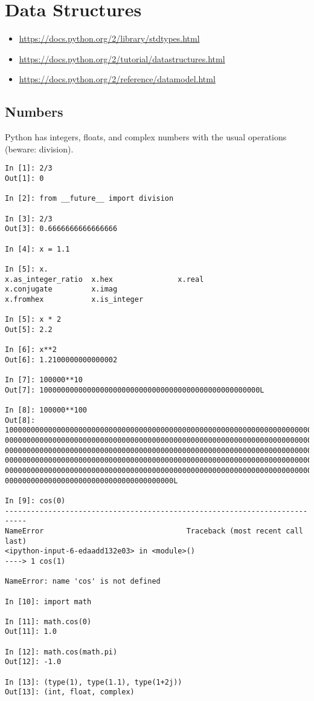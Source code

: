 \section{\label{sec:datastructures}Data Structures}
\begin{itemize}
\item \url{https://docs.python.org/2/library/stdtypes.html}
\item \url{https://docs.python.org/2/tutorial/datastructures.html}
\item \url{https://docs.python.org/2/reference/datamodel.html}
\end{itemize}

\subsection{Numbers}

Python has integers, floats, and complex numbers with the usual
operations (beware: division).

\begin{verbatim}
In [1]: 2/3
Out[1]: 0

In [2]: from __future__ import division

In [3]: 2/3
Out[3]: 0.6666666666666666

In [4]: x = 1.1

In [5]: x.
x.as_integer_ratio  x.hex               x.real
x.conjugate         x.imag              
x.fromhex           x.is_integer        

In [5]: x * 2
Out[5]: 2.2

In [6]: x**2
Out[6]: 1.2100000000000002

In [7]: 100000**10
Out[7]: 100000000000000000000000000000000000000000000000000L

In [8]: 100000**100
Out[8]: 10000000000000000000000000000000000000000000000000000000000000000000000000000000000000
0000000000000000000000000000000000000000000000000000000000000000000000000000000000000000000000
0000000000000000000000000000000000000000000000000000000000000000000000000000000000000000000000
0000000000000000000000000000000000000000000000000000000000000000000000000000000000000000000000
0000000000000000000000000000000000000000000000000000000000000000000000000000000000000000000000
000000000000000000000000000000000000000L

In [9]: cos(0)
---------------------------------------------------------------------------
NameError                                 Traceback (most recent call last)
<ipython-input-6-edaadd132e03> in <module>()
----> 1 cos(1)

NameError: name 'cos' is not defined

In [10]: import math

In [11]: math.cos(0)
Out[11]: 1.0

In [12]: math.cos(math.pi)
Out[12]: -1.0

In [13]: (type(1), type(1.1), type(1+2j))
Out[13]: (int, float, complex)
\end{verbatim}

